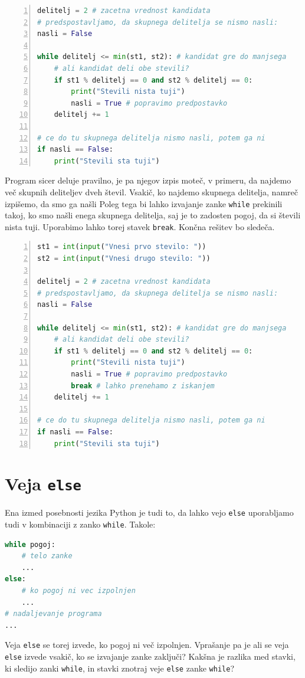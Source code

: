 \begin{resitev}
\begin{lstlisting}[language=Python,numbers=left]
delitelj = 2 # zacetna vrednost kandidata
# predspostavljamo, da skupnega delitelja se nismo nasli:
nasli = False 

while delitelj <= min(st1, st2): # kandidat gre do manjsega
    # ali kandidat deli obe stevili?
    if st1 % delitelj == 0 and st2 % delitelj == 0:
        print("Stevili nista tuji")
        nasli = True # popravimo predpostavko
    delitelj += 1

# ce do tu skupnega delitelja nismo nasli, potem ga ni        
if nasli == False: 
    print("Stevili sta tuji")
\end{lstlisting}
Program sicer deluje pravilno, je pa njegov izpis moteč, v primeru, da najdemo več skupnih deliteljev dveh števil. Vsakič, ko najdemo skupnega delitelja, namreč izpišemo, da smo ga našli
Poleg tega bi lahko izvajanje zanke \texttt{while} prekinili takoj, ko smo našli enega skupnega delitelja, saj je to zadosten pogoj, da si števili nista tuji. Uporabimo lahko torej stavek \texttt{break}. Končna rešitev bo sledeča.
\begin{lstlisting}[language=Python,numbers=left]
st1 = int(input("Vnesi prvo stevilo: "))
st2 = int(input("Vnesi drugo stevilo: "))

delitelj = 2 # zacetna vrednost kandidata
# predspostavljamo, da skupnega delitelja se nismo nasli:
nasli = False 

while delitelj <= min(st1, st2): # kandidat gre do manjsega
    # ali kandidat deli obe stevili?
    if st1 % delitelj == 0 and st2 % delitelj == 0:
        print("Stevili nista tuji")
        nasli = True # popravimo predpostavko
        break # lahko prenehamo z iskanjem
    delitelj += 1 

# ce do tu skupnega delitelja nismo nasli, potem ga ni        
if nasli == False: 
    print("Stevili sta tuji")
\end{lstlisting}
\end{resitev}

\section{Veja \texttt{else}}
Ena izmed posebnosti jezika Python je tudi to, da lahko vejo \texttt{else} uporabljamo tudi v kombinaciji z zanko \texttt{while}. Takole:
\begin{lstlisting}[language=Python]
while pogoj:
    # telo zanke
    ...
else:
    # ko pogoj ni vec izpolnjen
    ...
# nadaljevanje programa
...
\end{lstlisting}
Veja \texttt{else} se torej izvede, ko pogoj ni več izpolnjen. Vprašanje pa je ali se veja \texttt{else} izvede vsakič, ko se izvajanje zanke zaključi? Kakšna je razlika med stavki, ki sledijo zanki \texttt{while}, in stavki znotraj veje \texttt{else} zanke \texttt{while}? 

